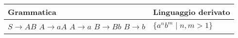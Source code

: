 \documentclass{standalone}
\begin{document}
\begin{tabularx}{\textwidth}{XX}
		Grammatica & Linguaggio derivato\\
    \midrule
        $S \to AB$ \newline
        $A \to aA$ \newline
        $A \to a$ \newline
        $B \to Bb$ \newline
        $B \to b$
        & 
        $\{a^n b^m \mid n,m > 1\}$ 
\end{tabularx}
\end{document}
